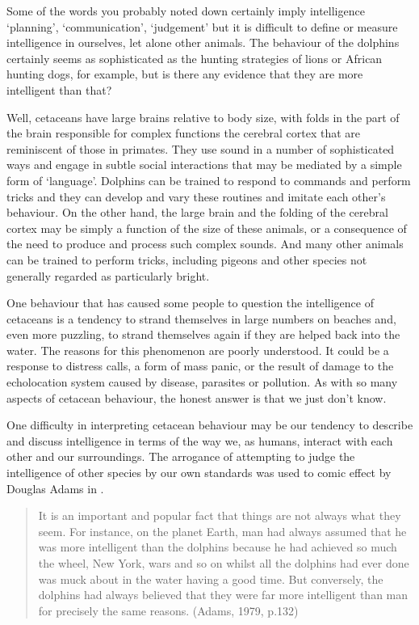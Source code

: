\documentclass[letterpaper,10pt,english]{sphinxmanual}
\begin{document}
Some of the words you probably noted down certainly imply intelligence \textendash{} ‘planning’, ‘communication’, ‘judgement’ \textendash{} but it is difficult to define or measure intelligence in ourselves, let alone other animals. The behaviour of the dolphins certainly seems as sophisticated as the hunting strategies of lions or African hunting dogs, for example, but is there any evidence that they are more intelligent than that?

Well, cetaceans have large brains relative to body size, with folds in the part of the brain responsible for complex functions \textendash{} the cerebral cortex \textendash{} that are reminiscent of those in primates. They use sound in a number of sophisticated ways and engage in subtle social interactions that may be mediated by a simple form of ‘language’. Dolphins can be trained to respond to commands and perform tricks \textendash{} and they can develop and vary these routines and imitate each other’s behaviour. On the other
hand, the large brain and the folding of the cerebral cortex may be simply a function of the size of these animals, or a consequence of the need to produce and process such complex sounds. And many other animals can be trained to perform tricks, including pigeons and other species not generally regarded as particularly bright.

One behaviour that has caused some people to question the intelligence of cetaceans is a tendency to strand themselves in large numbers on beaches and, even more puzzling, to strand themselves again if they are helped back into the water. The reasons for this phenomenon are poorly understood. It could be a response to distress calls, a form of mass panic, or the result of damage to the echolocation system caused by disease, parasites or pollution. As with so many aspects of cetacean behaviour,
the honest answer is that we just don’t know.

One difficulty in interpreting cetacean behaviour may be our tendency to describe and discuss intelligence in terms of the way we, as humans, interact with each other and our surroundings. The arrogance of attempting to judge the intelligence of other species by our own standards was used to comic effect by Douglas Adams in .


\begin{quote}

It is an important and popular fact that things are not always what they seem. For instance, on the planet Earth, man had always assumed that he was more intelligent than the dolphins because he had achieved so much \sphinxhyphen{} the wheel, New York, wars and so on \sphinxhyphen{} whilst all the dolphins had ever done was muck about in the water having a good time. But conversely, the dolphins had always believed that they were far more intelligent than man \sphinxhyphen{} for precisely the same reasons. (Adams, 1979, p.132)
\end{quote}
\end{document}
